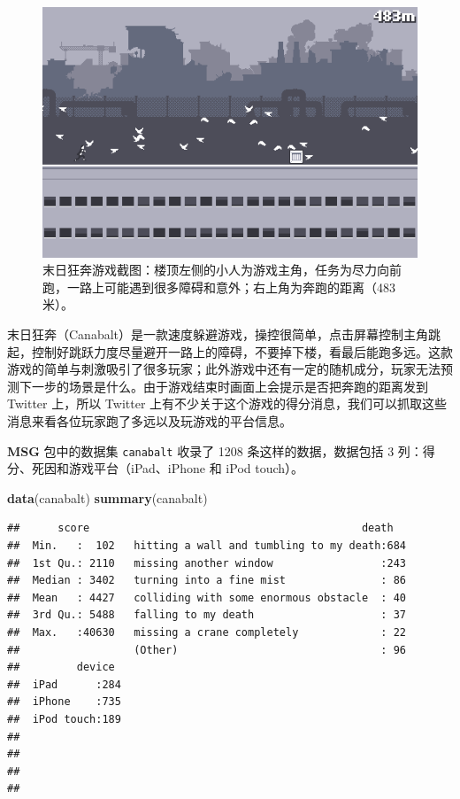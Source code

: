 \documentclass[
  b5paper,
  UTF8,twoside]{book}
\newenvironment{Shaded}{\begin{snugshade}}{\end{snugshade}}
\newcommand{\FunctionTok}[1]{\textcolor[rgb]{0.13,0.29,0.53}{\textbf{#1}}}
\newcommand{\NormalTok}[1]{#1}
\begin{document}
\begin{figure}

{\centering \includegraphics{images/canabalt-screenshot} 

}

\caption[末日狂奔游戏截图]{末日狂奔游戏截图：楼顶左侧的小人为游戏主角，任务为尽力向前跑，一路上可能遇到很多障碍和意外；右上角为奔跑的距离（483 米）。}\label{fig:canabalt-screenshot}
\end{figure}



末日狂奔（Canabalt）是一款速度躲避游戏，操控很简单，点击屏幕控制主角跳起，控制好跳跃力度尽量避开一路上的障碍，不要掉下楼，看最后能跑多远。这款游戏的简单与刺激吸引了很多玩家；此外游戏中还有一定的随机成分，玩家无法预测下一步的场景是什么。由于游戏结束时画面上会提示是否把奔跑的距离发到 Twitter 上，所以 Twitter 上有不少关于这个游戏的得分消息，我们可以抓取这些消息来看各位玩家跑了多远以及玩游戏的平台信息。

\textbf{MSG} 包中的数据集 \texttt{canabalt} 收录了 1208 条这样的数据，数据包括 3 列：得分、死因和游戏平台（iPad、iPhone 和 iPod touch）。

\begin{Shaded}
\begin{Highlighting}[]
\FunctionTok{data}\NormalTok{(canabalt)}
\FunctionTok{summary}\NormalTok{(canabalt)}
\end{Highlighting}
\end{Shaded}

\begin{verbatim}
##      score                                           death    
##  Min.   :  102   hitting a wall and tumbling to my death:684  
##  1st Qu.: 2110   missing another window                 :243  
##  Median : 3402   turning into a fine mist               : 86  
##  Mean   : 4427   colliding with some enormous obstacle  : 40  
##  3rd Qu.: 5488   falling to my death                    : 37  
##  Max.   :40630   missing a crane completely             : 22  
##                  (Other)                                : 96  
##         device   
##  iPad      :284  
##  iPhone    :735  
##  iPod touch:189  
##                  
##                  
##                  
## 
\end{verbatim}
\end{document}
